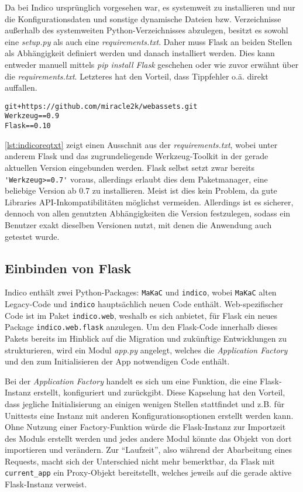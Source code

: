 Da bei Indico ursprünglich vorgesehen war, es systemweit zu installieren und nur die
Konfigurationsdaten und sonstige dynamische Dateien bzw. Verzeichnisse außerhalb des systemweiten
Python-Verzeichnisses abzulegen, besitzt es sowohl eine \emph{setup.py} als auch eine
\emph{requirements.txt}. Daher muss Flask an beiden Stellen als Abhängigkeit definiert werden und
danach installiert werden. Dies kann entweder manuell mittels \emph{pip install Flask} geschehen
oder wie zuvor erwähnt über die \emph{requirements.txt}. Letzteres hat den Vorteil, dass Tippfehler
o.ä. direkt auffallen.

\begin{lstlisting}[caption=Auszug aus der requirements.txt von Indico,label=lst:indicoreqtxt]
git+https://github.com/miracle2k/webassets.git
Werkzeug==0.9
Flask==0.10
\end{lstlisting}

\autoref{lst:indicoreqtxt} zeigt einen Ausschnit aus der \emph{requirements.txt}, wobei unter
anderem Flask und das zugrundeliegende Werkzeug-Toolkit in der gerade aktuellen Version eingebunden
werden. Flask selbst setzt zwar bereits \lstinline{'Werkzeug>=0.7'} voraus, allerdings erlaubt dies
dem Paketmanager, eine beliebige Version ab 0.7 zu installieren. Meist ist dies kein Problem, da
gute Libraries API-Inkompatibilitäten möglichst vermeiden. Allerdings ist es sicherer, dennoch von
allen genutzten Abhängigkeiten die Version festzulegen, sodass ein Benutzer exakt dieselben
Versionen nutzt, mit denen die Anwendung auch getestet wurde.


\subsection{Einbinden von Flask}

Indico enthält zwei Python-Packages: \lstinline{MaKaC} und \lstinline{indico}, wobei
\lstinline{MaKaC} alten Legacy-Code und \lstinline{indico} hauptsächlich neuen Code enthält.
Web-spezifischer Code ist im Paket \lstinline{indico.web}, weshalb es sich anbietet, für Flask ein
neues Package \lstinline{indico.web.flask} anzulegen. Um den Flask-Code innerhalb dieses Pakets
bereits im Hinblick auf die Migration und zukünftige Entwicklungen zu strukturieren, wird ein Modul
\emph{app.py} angelegt, welches die \emph{Application Factory} und den zum Initialisieren der App
notwendigen Code enthält.

Bei der \emph{Application Factory} handelt es sich um eine Funktion, die eine Flask-Instanz
erstellt, konfiguriert und zurückgibt. Diese Kapselung hat den Vorteil, dass jegliche Initialisierung an
einigen wenigen Stellen stattfindet und z.B. für Unittests eine Instanz mit anderen
Konfigurationsoptionen erstellt werden kann. Ohne Nutzung einer Factory-Funktion würde die
Flask-Instanz zur Importzeit des Moduls erstellt werden und jedes andere Modul könnte das Objekt von
dort importieren und verändern. Zur \enquote{Laufzeit}, also während der Abarbeitung eines Requests,
macht sich der Unterschied nicht mehr bemerktbar, da Flask mit \lstinline{current_app} ein
Proxy-Objekt bereitstellt, welches jeweils auf die gerade aktive Flask-Instanz verweist.

